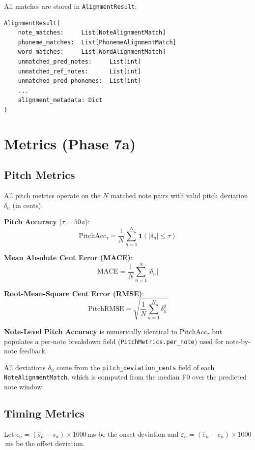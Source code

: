 \documentclass[11pt,letterpaper]{article}
\newcommand{\sh}{\hat{s}}
\newcommand{\eh}{\hat{e}}
\begin{document}
All matches are stored in \texttt{AlignmentResult}:
\begin{lstlisting}
AlignmentResult(
    note_matches:     List[NoteAlignmentMatch]
    phoneme_matches:  List[PhonemeAlignmentMatch]
    word_matches:     List[WordAlignmentMatch]
    unmatched_pred_notes:     List[int]
    unmatched_ref_notes:      List[int]
    unmatched_pred_phonemes:  List[int]
    ...
    alignment_metadata: Dict
)
\end{lstlisting}

\section{Metrics (Phase 7a)}

\subsection{Pitch Metrics}

All pitch metrics operate on the $N$ matched note pairs with valid pitch
deviation $\delta_n$ (in cents).

\textbf{Pitch Accuracy} ($\tau = 50$\,¢):
\[
  \mathrm{PitchAcc}_\tau = \frac{1}{N}\sum_{n=1}^{N}\mathbf{1}(|\delta_n| \le \tau)
\]

\textbf{Mean Absolute Cent Error (MACE)}:
\[
  \mathrm{MACE} = \frac{1}{N}\sum_{n=1}^{N}|\delta_n|
\]

\textbf{Root-Mean-Square Cent Error (RMSE)}:
\[
  \mathrm{PitchRMSE} = \sqrt{\frac{1}{N}\sum_{n=1}^{N}\delta_n^2}
\]

\textbf{Note-Level Pitch Accuracy} is numerically identical to
$\mathrm{PitchAcc}_\tau$ but populates a per-note breakdown field
(\texttt{PitchMetrics.per\_note}) used for note-by-note feedback.

All deviations $\delta_n$ come from the \texttt{pitch\_deviation\_cents} field
of each \texttt{NoteAlignmentMatch}, which is computed from the median F0 over
the predicted note window.

\subsection{Timing Metrics}

Let $\epsilon_n = (\sh_n - s_n) \times 1000$\,ms be the onset deviation and
$\varepsilon_n = (\eh_n - e_n) \times 1000$\,ms be the offset deviation.
\end{document}
